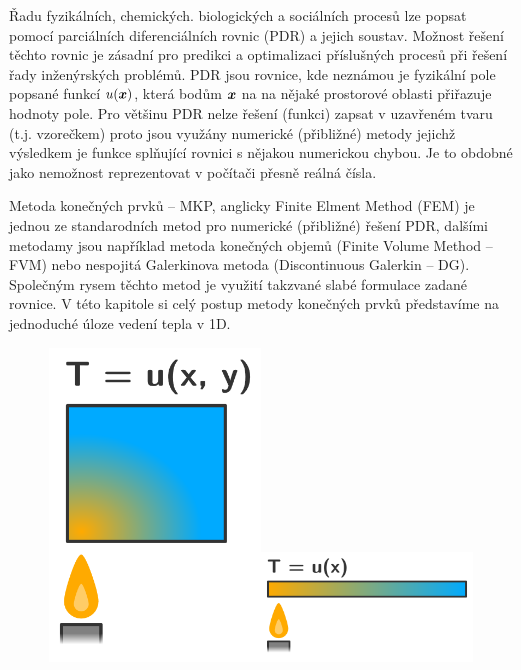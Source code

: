 Řadu fyzikálních, chemických. biologických a sociálních procesů lze 
popsat pomocí parciálních diferenciálních rovnic (PDR) a jejich soustav.
Možnost řešení těchto rovnic je zásadní pro predikci a optimalizaci 
příslušných procesů při řešení řady inženýrských problémů. PDR jsou rovnice, kde neznámou 
je fyzikální pole popsané funkcí $u(\mathbf{\boldsymbol{x}})$, která bodům $\mathbf{\boldsymbol{x}}$ 
na na nějaké prostorové oblasti přiřazuje hodnoty pole. 
Pro většinu PDR nelze řešení (funkci) zapsat v uzavřeném tvaru (t.j. vzorečkem) proto 
jsou využány numerické (přibližné) metody jejichž výsledkem je funkce splňující rovnici 
s nějakou numerickou chybou. Je to obdobné jako nemožnost reprezentovat v počítači přesně reálná čísla.

Metoda konečných prvků -- MKP, anglicky Finite Elment Method (FEM) je jednou ze standarodních metod pro numerické (přibližné)
řešení PDR, dalšími metodamy jsou například metoda konečných objemů (Finite Volume Method -- FVM) 
nebo nespojitá Galerkinova metoda (Discontinuous Galerkin -- DG).
Společným rysem těchto metod je využití takzvané slabé formulace zadané rovnice. 
V této kapitole si celý postup metody konečných prvků představíme na jednoduché úloze vedení tepla v 1D.

\begin{figure}
\includegraphics[width=0.5\textwidth]{img/image3.png}\includegraphics[width=0.5\textwidth]{img/image5.png}
\end{figure}

